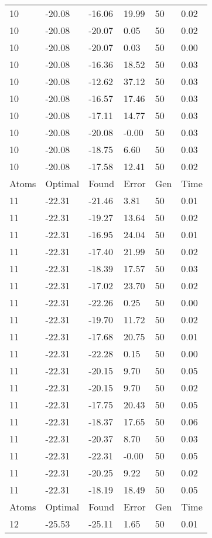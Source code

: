 \documentclass{report}
\begin{document}
\begin{appendix}
\begin{longtable}{llllll}
10 & -20.08 & -16.06 & 19.99 & 50 & 0.02 \\
10 & -20.08 & -20.07 & 0.05 & 50 & 0.02 \\
10 & -20.08 & -20.07 & 0.03 & 50 & 0.00 \\
10 & -20.08 & -16.36 & 18.52 & 50 & 0.03 \\
10 & -20.08 & -12.62 & 37.12 & 50 & 0.03 \\
10 & -20.08 & -16.57 & 17.46 & 50 & 0.03 \\
10 & -20.08 & -17.11 & 14.77 & 50 & 0.03 \\
10 & -20.08 & -20.08 & -0.00 & 50 & 0.03 \\
10 & -20.08 & -18.75 & 6.60 & 50 & 0.03 \\
10 & -20.08 & -17.58 & 12.41 & 50 & 0.02 \\
Atoms & Optimal & Found & Error & Gen & Time \\
11 & -22.31 & -21.46 & 3.81 & 50 & 0.01 \\
11 & -22.31 & -19.27 & 13.64 & 50 & 0.02 \\
11 & -22.31 & -16.95 & 24.04 & 50 & 0.01 \\
11 & -22.31 & -17.40 & 21.99 & 50 & 0.02 \\
11 & -22.31 & -18.39 & 17.57 & 50 & 0.03 \\
11 & -22.31 & -17.02 & 23.70 & 50 & 0.02 \\
11 & -22.31 & -22.26 & 0.25 & 50 & 0.00 \\
11 & -22.31 & -19.70 & 11.72 & 50 & 0.02 \\
11 & -22.31 & -17.68 & 20.75 & 50 & 0.01 \\
11 & -22.31 & -22.28 & 0.15 & 50 & 0.00 \\
11 & -22.31 & -20.15 & 9.70 & 50 & 0.05 \\
11 & -22.31 & -20.15 & 9.70 & 50 & 0.02 \\
11 & -22.31 & -17.75 & 20.43 & 50 & 0.05 \\
11 & -22.31 & -18.37 & 17.65 & 50 & 0.06 \\
11 & -22.31 & -20.37 & 8.70 & 50 & 0.03 \\
11 & -22.31 & -22.31 & -0.00 & 50 & 0.05 \\
11 & -22.31 & -20.25 & 9.22 & 50 & 0.02 \\
11 & -22.31 & -18.19 & 18.49 & 50 & 0.05 \\
Atoms & Optimal & Found & Error & Gen & Time \\
12 & -25.53 & -25.11 & 1.65 & 50 & 0.01 \\

\end{longtable}
\end{appendix}
\end{document}
